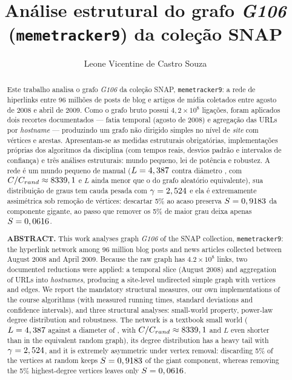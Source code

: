 \documentclass[sigconf]{webmedia}
\begin{document}
\title{An\'alise estrutural do grafo \textit{G106}
       (\texttt{memetracker9}) da cole\c{c}\~ao SNAP}

\author{Leone Vicentine de Castro Souza}

\begin{abstract}
Este trabalho analisa o grafo \textit{G106} da coleção SNAP,
\texttt{memetracker9}: a rede de hiperlinks entre 96 milhões de posts de
blog e artigos de mídia coletados entre agosto de 2008 e abril de 2009.
Como o grafo bruto possui $4{,}2\times10^{8}$ ligações, foram aplicados
dois recortes documentados --- fatia temporal (agosto de 2008) e agregação
das URLs por \emph{hostname} --- produzindo um grafo não dirigido simples
no nível de \emph{site} com \numVertices{} vértices e \numArestas{}
arestas. Apresentam-se as medidas estruturais obrigatórias, implementações
próprias dos algoritmos da disciplina (com tempos reais, desvios padrão e
intervalos de confiança) e três análises estruturais: mundo pequeno, lei de
potência e robustez. A rede é um mundo pequeno de manual ($L=4,387$ contra
diâmetro \diametro{}, com $C/C_{rand}\approx8339,1$ e $L$ ainda
menor que o do grafo aleatório equivalente), sua distribuição de
graus tem cauda pesada com $\gamma=2,524$ e ela é extremamente
assimétrica sob remoção de vértices: descartar 5\% ao acaso preserva
$S=0,9183$ da componente gigante, ao passo que remover os 5\% de maior
grau deixa apenas $S=0,0616$.

\medskip\noindent\textbf{ABSTRACT.}
This work analyses graph \textit{G106} of the SNAP collection,
\texttt{memetracker9}: the hyperlink network among 96 million blog posts
and news articles collected between August 2008 and April 2009. Because
the raw graph has $4.2\times10^{8}$ links, two documented reductions were
applied: a temporal slice (August 2008) and aggregation of URLs into
\emph{hostnames}, producing a site-level undirected simple graph with
\numVertices{} vertices and \numArestas{} edges. We report the mandatory
structural measures, our own implementations of the course algorithms
(with measured running times, standard deviations and confidence
intervals), and three structural analyses: small-world property, power-law
degree distribution and robustness. The network is a textbook small world
($L=4,387$ against a diameter of \diametro{}, with $C/C_{rand}\approx
8339,1$ and $L$ even shorter than in the equivalent random graph), its degree distribution has a heavy tail with
$\gamma=2,524$, and it is extremely asymmetric under vertex removal:
discarding 5\% of the vertices at random keeps $S=0,9183$ of the giant
component, whereas removing the 5\% highest-degree vertices leaves only
$S=0,0616$.
\end{abstract}
\end{document}
